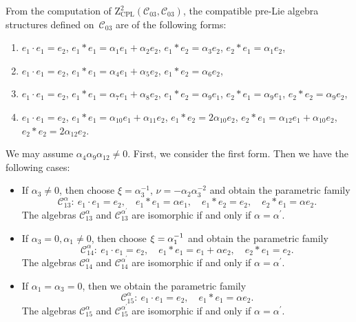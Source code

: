 \documentclass[10pt,a4paper]{amsart}
\numberwithin{equation}{section}
\begin{document}
From the computation of $\mathrm{Z}_{\mathrm{CPL}}^{2}(\mathcal{C}_{03},%
\mathcal{C}_{03})$, the compatible pre-Lie algebra structures defined on~$%
\mathcal{C}_{03}$ are of the following forms:
\begin{enumerate}\itemsep=0pt
\item[(1)] $
e_{1}\cdot e_{1}=e_{2}$, $
e_{1}\ast e_{1}=\alpha _{1}e_{1}+\alpha _{2}e_{2}$, $ e_{1}\ast
e_{2}=\alpha _{3}e_{2}$, $ e_{2}\ast e_{1}=\alpha _{1}e_{2}$,
\item[(2)] $
e_{1}\cdot e_{1}=e_{2}$, $
e_{1}\ast e_{1}=\alpha _{4}e_{1}+\alpha _{5}e_{2}$, $ e_{1}\ast
e_{2}=\alpha _{6}e_{2}$,
\item[(3)] $
e_{1}\cdot e_{1}=e_{2}$, $
e_{1}\ast e_{1}=\alpha _{7}e_{1}+\alpha _{8}e_{2}$, $ e_{1}\ast
e_{2}=\alpha _{9}e_{1}$, $ e_{2}\ast e_{1}=\alpha _{9}e_{1}$, $ e_{2}\ast
e_{2}=\alpha _{9}e_{2}$,
\item[(4)] $
e_{1}\cdot e_{1}=e_{2}$, $
e_{1}\ast e_{1}=\alpha _{10}e_{1}+\alpha _{11}e_{2}$, $ e_{1}\ast
e_{2}=2\alpha _{10}e_{2}$,
$
e_{2}\ast e_{1}=\alpha _{12}e_{1}+\alpha
_{10}e_{2}$, $ e_{2}\ast e_{2}=2\alpha _{12}e_{2}$.
\end{enumerate}

We may assume $\alpha _{4}\alpha _{9}\alpha _{12}\neq 0$.
First, we consider the first form. Then we have the following cases:
\begin{itemize}\itemsep=0pt
\item If $\alpha _{3}\neq 0$, then choose $\xi =\alpha^{-1} _{3}$, $\nu =-%
{\alpha _{2}}{\alpha _{3}^{-2}}$ and obtain the parametric family
\[
\mathcal{C}_{13}^{\alpha } \colon \
e_{1}\cdot e_{1}=e_{2},\quad
e_{1}\ast e_{1}=\alpha e_{1},\quad e_{1}\ast e_{2}=e_{2},\quad e_{2}\ast
e_{1}=\alpha e_{2}.
\]
The algebras $\mathcal{C}_{13}^{\alpha }$ and $\mathcal{C}_{13}^{\alpha ^{\prime
}} $ are isomorphic if and only if $\alpha =\alpha ^{\prime }$.

\item If $\alpha _{3}=0,\alpha _{1}\neq 0$, then choose $\xi ={%
\alpha^{-1} _{1}}$ and obtain the parametric family
\[
\mathcal{C}_{14}^{\alpha } \colon \
e_{1}\cdot e_{1}=e_{2},\quad
e_{1}\ast e_{1}=e_{1}+\alpha e_{2},\quad e_{2}\ast e_{1}=e_{2}.
\]
The algebras $\mathcal{C}_{14}^{\alpha }$ and $\mathcal{C}_{14}^{\alpha ^{\prime
}} $ are isomorphic if and only if $\alpha =\alpha ^{\prime }$.

\item If $\alpha _{1}=\alpha _{3}=0$, then we obtain the parametric family
\[
\mathcal{C}_{15}^{\alpha } \colon \
e_{1}\cdot e_{1}=e_{2}, \quad
e_{1}\ast e_{1}=\alpha e_{2}.
\]
The algebras $\mathcal{C}_{15}^{\alpha }$ and $\mathcal{C}_{15}^{\alpha ^{\prime
}} $ are isomorphic if and only if $\alpha =\alpha ^{\prime }$.
\end{itemize}
\end{document}
